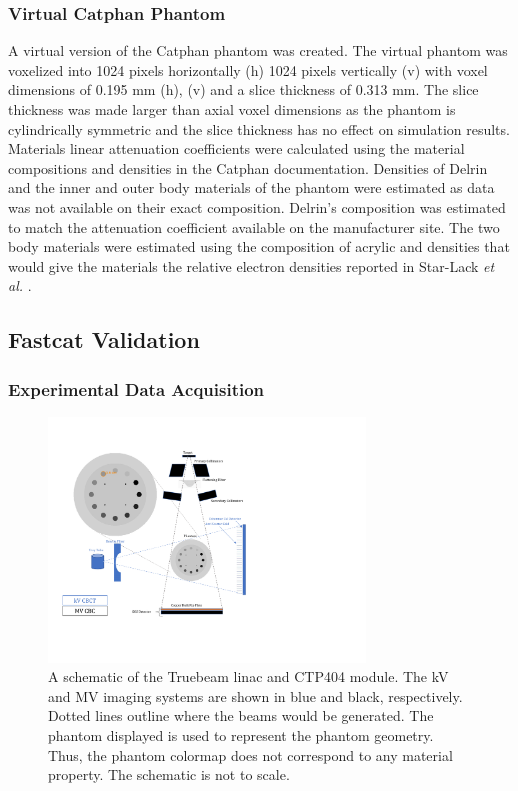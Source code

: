 \subsubsection{Virtual Catphan Phantom}

 A virtual version of the Catphan phantom was created. The virtual phantom was voxelized into 1024 pixels horizontally (h) 1024 pixels vertically (v) with voxel dimensions of 0.195 mm (h), (v) and a slice thickness of 0.313 mm. The slice thickness was made larger than axial voxel dimensions as the phantom is cylindrically symmetric and the slice thickness has no effect on simulation results. Materials linear attenuation coefficients were calculated using the material compositions and densities in the Catphan documentation. Densities of Delrin and the inner and outer body materials of the phantom were estimated as data was not available on their exact composition. Delrin’s composition was estimated to match the attenuation coefficient available on the manufacturer site. The two body materials were estimated using the composition of acrylic and densities that would give the materials the relative electron densities reported in Star-Lack \textit{et al.} \cite{Star-Lack2015AImaging}.
 
\subsection{Fastcat Validation}
 
\subsubsection{Experimental Data Acquisition}

\begin{figure}[h!]
  \begin{center}
  \includegraphics[width=0.75\textwidth,trim={1cm 4cm 9.5cm 2cm}, clip]{figures/setup_figure.pdf}
  \caption{
  A schematic of the Truebeam linac and CTP404 module. The kV and MV imaging systems are shown in blue and black, respectively. Dotted lines outline where the beams would be generated. The phantom displayed is used to represent the phantom geometry. Thus, the phantom colormap does not correspond to any material property. The schematic is not to scale. 
  \label{fig_setup_val} 
    }  %
    \end{center}
\end{figure}


